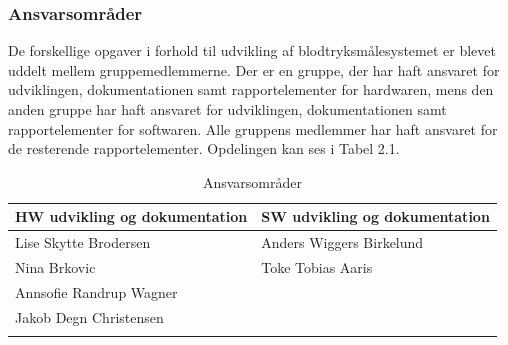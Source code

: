 \subsubsection{Ansvarsområder}
De forskellige opgaver i forhold til udvikling af blodtryksmålesystemet er blevet uddelt mellem gruppemedlemmerne. Der er en gruppe, der har haft ansvaret for udviklingen, dokumentationen samt rapportelementer for hardwaren, mens den anden gruppe har haft ansvaret for udviklingen, dokumentationen samt rapportelementer for softwaren. Alle gruppens medlemmer har haft ansvaret for de resterende rapportelementer. Opdelingen kan ses i Tabel 2.1.    

\begin{longtabu} to 
	\textbf{HW udvikling og dokumentation} & \textbf{SW udvikling og dokumentation} \\[-1ex]
	\midrule
	Lise Skytte Brodersen & Anders Wiggers Birkelund\\[-1ex]
	Nina Brkovic & Toke Tobias Aaris \\[-1ex]
	Annsofie Randrup Wagner & \\[-1ex]
	Jakob Degn Christensen & \\[-1ex]

	\caption{Ansvarsområder}
\end{longtabu}



